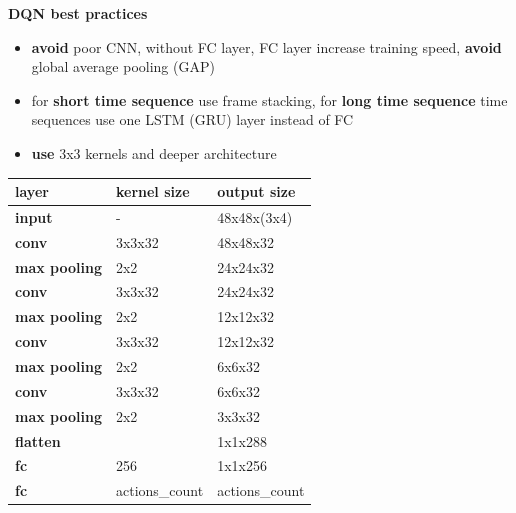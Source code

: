 \documentclass[xcolor=dvipsnames]{beamer}
\begin{document}
\begin{frame}{\bf DQN best practices}
\vspace{-5mm}

{\small
\begin{itemize}
  \item {\color{red} \bf avoid} poor CNN, without FC layer, FC layer increase training speed, {\color{red} \bf avoid} global average pooling (GAP)
  \item for {\color{green} \bf short time sequence} use frame stacking, for {\color{green} \bf long time sequence} time sequences use one LSTM (GRU) layer instead of FC
  \item {\color{green} \bf use} 3x3 kernels and deeper architecture
\end{itemize}
}

{\small

    \begin{table}[]
    \begin{tabular}{|l|l|l|}
    \hline
    \textbf{layer}       & \textbf{kernel size} & \textbf{output size} \\ \hline
    \rowcolor[HTML]{C0C0C0}
    \textbf{input}       & -                    & 48x48x(3x4)          \\ \hline
    \rowcolor[HTML]{FD6864}
    \textbf{conv}        & 3x3x32               & 48x48x32             \\ \hline
    \rowcolor[HTML]{9698ED}
    \textbf{max pooling} & 2x2                  & 24x24x32             \\ \hline
    \rowcolor[HTML]{FD6864}
    \textbf{conv}        & 3x3x32               & 24x24x32             \\ \hline
    \rowcolor[HTML]{9698ED}
    \textbf{max pooling} & 2x2                  & 12x12x32             \\ \hline
    \rowcolor[HTML]{FD6864}
    \textbf{conv}        & 3x3x32               & 12x12x32             \\ \hline
    \rowcolor[HTML]{9698ED}
    \textbf{max pooling} & 2x2                  & 6x6x32               \\ \hline
    \rowcolor[HTML]{FD6864}
    \textbf{conv}        & 3x3x32               & 6x6x32               \\ \hline
    \rowcolor[HTML]{9698ED}
    \textbf{max pooling} & 2x2                  & 3x3x32               \\ \hline
    \rowcolor[HTML]{C0C0C0}
    \textbf{flatten}     &                      & 1x1x288              \\ \hline
    \rowcolor[HTML]{67FD9A}
    \textbf{fc}          & 256                  & 1x1x256              \\ \hline
    \rowcolor[HTML]{67FD9A}
    \textbf{fc}          & actions\_count       & actions\_count       \\ \hline
    \end{tabular}
    \end{table}



}

\end{frame}
\end{document}
